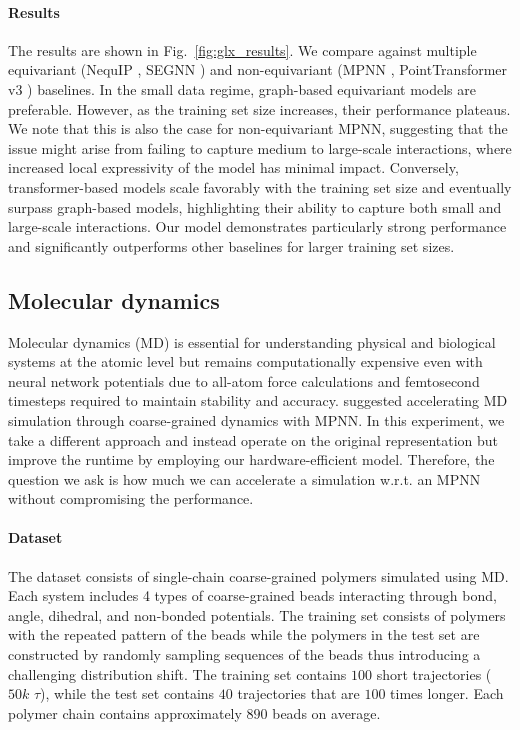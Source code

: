 \paragraph{Results}
The results are shown in Fig.~\ref{fig:glx_results}. We compare against multiple equivariant (NequIP \cite{Batzner2021E3equivariantGN}, SEGNN \cite{Brandstetter2021GeometricAP}) and non-equivariant (MPNN \cite{gilmer2017neuralmessagepassingquantum}, PointTransformer v3 \cite{Wu2023PointTV}) baselines. In the small data regime, graph-based equivariant models are preferable. However, as the training set size increases, their performance plateaus. We note that this is also the case for non-equivariant MPNN, suggesting that the issue might arise from failing to capture medium to large-scale interactions, where increased local expressivity of the model has minimal impact. Conversely, transformer-based models scale favorably with the training set size and eventually surpass graph-based models, highlighting their ability to capture both small and large-scale interactions. Our model demonstrates particularly strong performance and significantly outperforms other baselines for larger training set sizes. 


\vspace{-5pt}
\subsection{Molecular dynamics}

Molecular dynamics (MD) is essential for understanding physical and biological systems at the atomic level but remains computationally expensive even with neural network potentials due to all-atom force calculations and femtosecond timesteps required to maintain stability and accuracy. \citet{Fu2022SimulateTC} suggested accelerating MD simulation through coarse-grained dynamics with MPNN. In this experiment, we take a different approach and instead operate on the original representation but improve the runtime by employing our hardware-efficient model. Therefore, the question we ask is how much we can accelerate a simulation w.r.t. an MPNN without compromising the performance.

\vspace{-5pt}
\paragraph{Dataset}
The dataset consists of single-chain coarse-grained polymers \cite{Webb2020TargetedSD, Fu2022SimulateTC} simulated using MD. Each system includes 4 types of coarse-grained beads interacting through bond, angle, dihedral, and non-bonded potentials. The training set consists of polymers with the repeated pattern of the beads while the polymers in the test set are constructed by randomly sampling sequences of the beads thus introducing a challenging distribution shift. The training set contains $100$ short trajectories ($50k$ $\tau$), while the test set contains $40$ trajectories that are $100$ times longer. Each polymer chain contains approximately $890$ beads on average.

